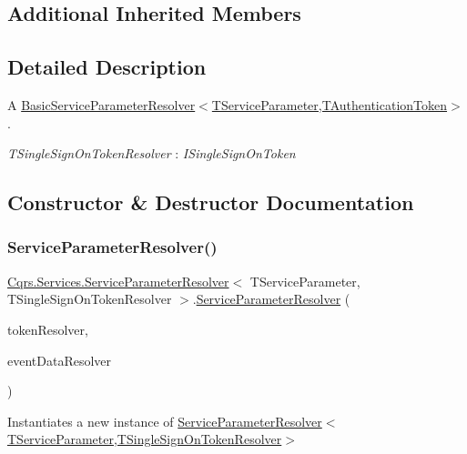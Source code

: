 \subsection*{Additional Inherited Members}


\subsection{Detailed Description}
A \hyperlink{classCqrs_1_1Services_1_1BasicServiceParameterResolver_af82f43a2f64aa5c33a3692a2a689367b_af82f43a2f64aa5c33a3692a2a689367b}{Basic\+Service\+Parameter\+Resolver$<$\+T\+Service\+Parameter,\+T\+Authentication\+Token$>$}. 

\begin{Desc}
\item[Type Constraints]\begin{description}
\item[{\em T\+Single\+Sign\+On\+Token\+Resolver} : {\em I\+Single\+Sign\+On\+Token}]\end{description}
\end{Desc}


\subsection{Constructor \& Destructor Documentation}
\mbox{\label{classCqrs_1_1Services_1_1ServiceParameterResolver_ad7afabf942df245316a2b27d31ee30bd_ad7afabf942df245316a2b27d31ee30bd}} 
\subsubsection{\texorpdfstring{Service\+Parameter\+Resolver()}{ServiceParameterResolver()}}
{\footnotesize\ttfamily \hyperlink{classCqrs_1_1Services_1_1ServiceParameterResolver}{Cqrs.\+Services.\+Service\+Parameter\+Resolver}$<$ T\+Service\+Parameter, T\+Single\+Sign\+On\+Token\+Resolver $>$.\hyperlink{classCqrs_1_1Services_1_1ServiceParameterResolver}{Service\+Parameter\+Resolver} (\begin{DoxyParamCaption}\item[{\hyperlink{interfaceCqrs_1_1Services_1_1ISingleSignOnTokenResolver}{I\+Single\+Sign\+On\+Token\+Resolver}}]{token\+Resolver,  }\item[{\hyperlink{interfaceCqrs_1_1Services_1_1IEventDataResolver}{I\+Event\+Data\+Resolver}}]{event\+Data\+Resolver }\end{DoxyParamCaption})\hspace{0.3cm}{\ttfamily [protected]}}



Instantiates a new instance of \hyperlink{classCqrs_1_1Services_1_1ServiceParameterResolver_ad7afabf942df245316a2b27d31ee30bd_ad7afabf942df245316a2b27d31ee30bd}{Service\+Parameter\+Resolver$<$\+T\+Service\+Parameter,\+T\+Single\+Sign\+On\+Token\+Resolver$>$} 


